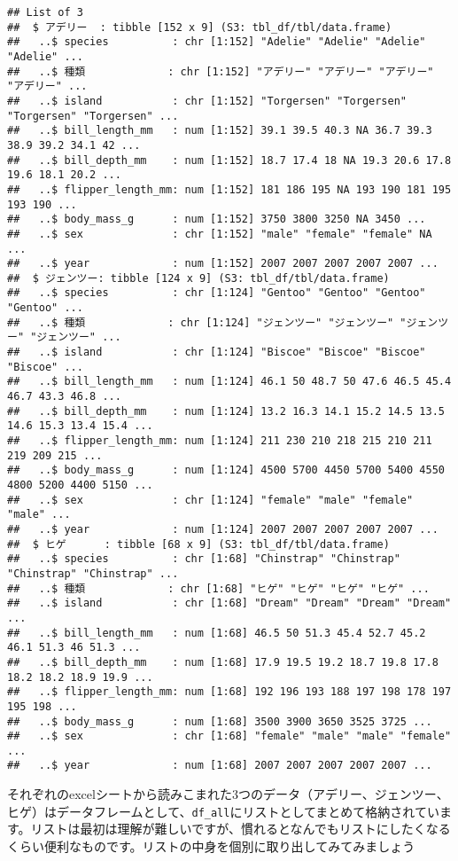 \documentclass[
  xelatex,ja=standard, b5paper]{bxjsbook}
\begin{document}
\begin{verbatim}
## List of 3
##  $ アデリー  : tibble [152 x 9] (S3: tbl_df/tbl/data.frame)
##   ..$ species          : chr [1:152] "Adelie" "Adelie" "Adelie" "Adelie" ...
##   ..$ 種類             : chr [1:152] "アデリー" "アデリー" "アデリー" "アデリー" ...
##   ..$ island           : chr [1:152] "Torgersen" "Torgersen" "Torgersen" "Torgersen" ...
##   ..$ bill_length_mm   : num [1:152] 39.1 39.5 40.3 NA 36.7 39.3 38.9 39.2 34.1 42 ...
##   ..$ bill_depth_mm    : num [1:152] 18.7 17.4 18 NA 19.3 20.6 17.8 19.6 18.1 20.2 ...
##   ..$ flipper_length_mm: num [1:152] 181 186 195 NA 193 190 181 195 193 190 ...
##   ..$ body_mass_g      : num [1:152] 3750 3800 3250 NA 3450 ...
##   ..$ sex              : chr [1:152] "male" "female" "female" NA ...
##   ..$ year             : num [1:152] 2007 2007 2007 2007 2007 ...
##  $ ジェンツー: tibble [124 x 9] (S3: tbl_df/tbl/data.frame)
##   ..$ species          : chr [1:124] "Gentoo" "Gentoo" "Gentoo" "Gentoo" ...
##   ..$ 種類             : chr [1:124] "ジェンツー" "ジェンツー" "ジェンツー" "ジェンツー" ...
##   ..$ island           : chr [1:124] "Biscoe" "Biscoe" "Biscoe" "Biscoe" ...
##   ..$ bill_length_mm   : num [1:124] 46.1 50 48.7 50 47.6 46.5 45.4 46.7 43.3 46.8 ...
##   ..$ bill_depth_mm    : num [1:124] 13.2 16.3 14.1 15.2 14.5 13.5 14.6 15.3 13.4 15.4 ...
##   ..$ flipper_length_mm: num [1:124] 211 230 210 218 215 210 211 219 209 215 ...
##   ..$ body_mass_g      : num [1:124] 4500 5700 4450 5700 5400 4550 4800 5200 4400 5150 ...
##   ..$ sex              : chr [1:124] "female" "male" "female" "male" ...
##   ..$ year             : num [1:124] 2007 2007 2007 2007 2007 ...
##  $ ヒゲ      : tibble [68 x 9] (S3: tbl_df/tbl/data.frame)
##   ..$ species          : chr [1:68] "Chinstrap" "Chinstrap" "Chinstrap" "Chinstrap" ...
##   ..$ 種類             : chr [1:68] "ヒゲ" "ヒゲ" "ヒゲ" "ヒゲ" ...
##   ..$ island           : chr [1:68] "Dream" "Dream" "Dream" "Dream" ...
##   ..$ bill_length_mm   : num [1:68] 46.5 50 51.3 45.4 52.7 45.2 46.1 51.3 46 51.3 ...
##   ..$ bill_depth_mm    : num [1:68] 17.9 19.5 19.2 18.7 19.8 17.8 18.2 18.2 18.9 19.9 ...
##   ..$ flipper_length_mm: num [1:68] 192 196 193 188 197 198 178 197 195 198 ...
##   ..$ body_mass_g      : num [1:68] 3500 3900 3650 3525 3725 ...
##   ..$ sex              : chr [1:68] "female" "male" "male" "female" ...
##   ..$ year             : num [1:68] 2007 2007 2007 2007 2007 ...
\end{verbatim}

それぞれのexcelシートから読みこまれた3つのデータ（アデリー、ジェンツー、ヒゲ）はデータフレームとして、\texttt{df\_all}にリストとしてまとめて格納されています。リストは最初は理解が難しいですが、慣れるとなんでもリストにしたくなるくらい便利なものです。リストの中身を個別に取り出してみてみましょう
\end{document}
